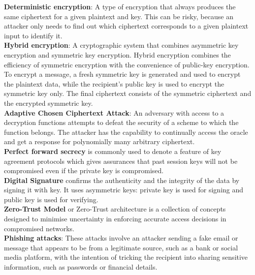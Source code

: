 \documentclass[pdflatex,sn-mathphys-num]{sn-jnl}%
\theoremstyle{thmstyleone}%
\theoremstyle{thmstyletwo}%
\theoremstyle{thmstylethree}%
\begin{document}
\noindent \textbf{Deterministic encryption}: A type of encryption that always produces the same ciphertext for a given plaintext and key. This can be risky, because an attacker only needs to find out which ciphertext corresponds to a given plaintext input to identify it.\\

\noindent \textbf{Hybrid encryption}: A cryptographic system that combines asymmetric key encryption and symmetric key encryption. Hybrid encryption combines the efficiency of symmetric encryption with the convenience of public-key encryption. To encrypt a message, a fresh symmetric key is generated and used to encrypt the plaintext data, while the recipient’s public key is used to encrypt the symmetric key only. The final ciphertext consists of the symmetric ciphertext and the encrypted symmetric key.\\






\noindent \textbf{Adaptive Chosen Ciphertext Attack}: An adversary with access to a decryption functions attempts to defeat the security of a scheme to which the function belongs. The attacker has the capability to continually access the oracle and get a response for polynomially many arbitrary ciphertext.\\

\noindent \textbf{Perfect forward secrecy } is commonly used to denote a feature of key agreement protocols which gives assurances that past session keys will not be compromised even if the private key  is compromised.\\

\noindent \textbf{Digital Signature} confirms the authenticity and the integrity of the data by signing it with key. It uses asymmetric keys: private key is used for signing and public key is used for verifying.\\

\noindent \textbf{Zero-Trust Model} or Zero-Trust architecture is a collection of concepts designed to minimise uncertainty in enforcing accurate access decisions in compromised networks. \\



\noindent \textbf{Phishing attacks}: These attacks involve an attacker sending a fake email or message that appears to be from a legitimate source, such as a bank or social media platform, with the intention of tricking the recipient into sharing sensitive information, such as passwords or financial details.\\
\end{document}
